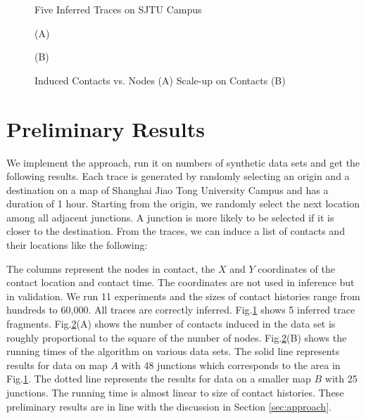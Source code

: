 \begin{figure}[th]
\centering
{}
\caption{Five Inferred Traces on SJTU Campus}
\label{fig:sjtu}
\end{figure}

\begin{figure}
\begin{minipage}[th]{0.48\columnwidth}
\centering
{}
{\small(A)}
\end{minipage}
\hfill
\begin{minipage}[th]{0.48\columnwidth}
\centering
{}
{\small(B)}
\end{minipage}
\caption{Induced Contacts vs. Nodes (A)
Scale-up on Contacts (B)}
\label{fig:scale}
\end{figure}

\section{Preliminary Results}
We implement the approach, run it on numbers of synthetic data sets 
and get the following results. 
Each trace is generated by randomly selecting an origin
and a destination on a map of Shanghai Jiao Tong University
Campus and has a duration of 1 hour. Starting from the origin, we randomly
select the next location among all adjacent junctions. A junction 
is more likely to be selected if it is closer to the destination. 
From the traces, we can induce a list of contacts and their locations like the following:
\begin{center}
\end{center}
The columns represent the nodes in contact, the $X$ and $Y$ coordinates
of the contact location and contact time. The coordinates are
not used in inference but in validation.
We run 11 experiments and the sizes of contact histories range from hundreds to 60,000. 
All traces are correctly inferred.
Fig.\ref{fig:sjtu} shows 5 inferred trace fragments. Fig.\ref{fig:scale}(A) shows the number of contacts induced in the
data set is roughly proportional to the square of the number of nodes. 
Fig.\ref{fig:scale}(B) shows the running times of the
algorithm on various data sets. 
The solid line represents results for data on map $A$ 
with 48 junctions which corresponds to the area in Fig.\ref{fig:sjtu}. 
The dotted line represents the results for data on a smaller 
map $B$ with 25 junctions. 
The running time is almost linear to size of contact histories.
These preliminary results are in line with the discussion in Section \ref{sec:approach}.


